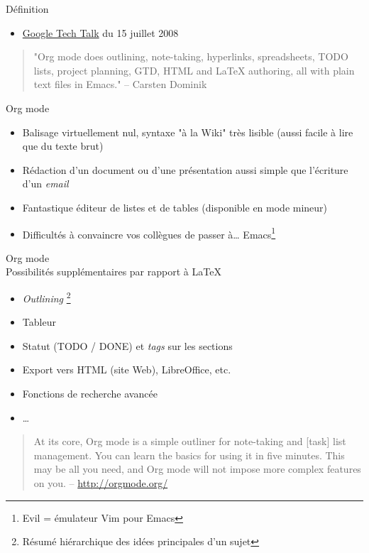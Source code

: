 \documentclass[presentation,t,hideothersubsections]{beamer}
\begin{document}
\begin{frame}[label=sec-1-2-1]{Définition}
\begin{itemize}
\item \href{http://orgmode.org/worg/org-tutorials/org-screencasts/org-mode-google-tech-talk.html}{Google Tech Talk} du 15 juillet 2008
\end{itemize}

\begin{quote}
"Org mode does outlining, note-taking, hyperlinks, spreadsheets, TODO lists,
project planning, GTD, HTML and \LaTeX{} authoring, all with plain text files in
Emacs." -- Carsten Dominik
\end{quote}
\end{frame}
\begin{frame}[label=sec-1-2-2]{Org mode}
\begin{itemize}
\item \alert{Balisage} virtuellement nul, syntaxe "à la Wiki" \alert{très lisible} (aussi facile à
lire que du texte brut)

\item \alert{Rédaction} d'un document ou d'une présentation aussi \alert{simple} que l'écriture
d'un \emph{email}

\item Fantastique éditeur de \alert{listes} et de \alert{tables} (disponible en mode mineur)

\item Difficultés à convaincre vos collègues de passer à\ldots{} Emacs\footnote{Evil = émulateur Vim pour Emacs}
\end{itemize}
\end{frame}
\begin{frame}[label=sec-1-2-3]{Org mode \\ Possibilités supplémentaires par rapport à \LaTeX{}}
\begin{itemize}
\item \emph{Outlining} \footnote{Résumé hiérarchique des idées principales d'un sujet}
\item Tableur
\item Statut (TODO / DONE) et \emph{tags} sur les sections
\item Export vers HTML (site Web), LibreOffice, etc.
\item Fonctions de recherche avancée
\item \ldots{}
\end{itemize}

\begin{quote}
At its core, Org mode is a simple outliner for \alert{note-taking} and \alert{[task] list
management}. You can learn the basics for using it in five minutes. This may
be all you need, and Org mode will not impose more complex features on you.
-- \url{http://orgmode.org/}
\end{quote}
\end{frame}
\end{document}
